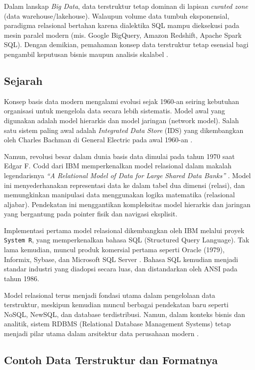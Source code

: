 Dalam lanskap \emph{Big Data}, data terstruktur tetap dominan di lapisan \emph{curated zone} (data warehouse/lakehouse). Walaupun volume data tumbuh eksponensial, paradigma relasional bertahan karena dialektika SQL mampu dieksekusi pada mesin paralel modern (mis. Google BigQuery, Amazon Redshift, Apache Spark SQL). Dengan demikian, pemahaman konsep data terstruktur tetap esensial bagi pengambil keputusan bisnis maupun analisis skalabel \cite{gartner2023dm}.

\subsection{Sejarah}

Konsep basis data modern mengalami evolusi sejak 1960-an seiring kebutuhan organisasi untuk mengelola data secara lebih sistematis. Model awal yang digunakan adalah model hierarkis dan model jaringan (network model). Salah satu sistem paling awal adalah \emph{Integrated Data Store} (IDS) yang dikembangkan oleh Charles Bachman di General Electric pada awal 1960-an \cite{bachman1973}.

Namun, revolusi besar dalam dunia basis data dimulai pada tahun 1970 saat Edgar F. Codd dari IBM memperkenalkan model relasional dalam makalah legendarisnya \emph{“A Relational Model of Data for Large Shared Data Banks”} \cite{codd1970}. Model ini menyederhanakan representasi data ke dalam tabel dua dimensi (relasi), dan memungkinkan manipulasi data menggunakan logika matematika (relasional aljabar). Pendekatan ini menggantikan kompleksitas model hierarkis dan jaringan yang bergantung pada pointer fisik dan navigasi eksplisit.

Implementasi pertama model relasional dikembangkan oleh IBM melalui proyek \texttt{System R}, yang memperkenalkan bahasa SQL (Structured Query Language). Tak lama kemudian, muncul produk komersial pertama seperti Oracle (1979), Informix, Sybase, dan Microsoft SQL Server \cite{elmasri2016}. Bahasa SQL kemudian menjadi standar industri yang diadopsi secara luas, dan distandarkan oleh ANSI pada tahun 1986.

Model relasional terus menjadi fondasi utama dalam pengelolaan data terstruktur, meskipun kemudian muncul berbagai pendekatan baru seperti NoSQL, NewSQL, dan database terdistribusi. Namun, dalam konteks bisnis dan analitik, sistem RDBMS (Relational Database Management Systems) tetap menjadi pilar utama dalam arsitektur data perusahaan modern \cite{kimball2013}.


\subsection{Contoh Data Terstruktur dan Formatnya}

